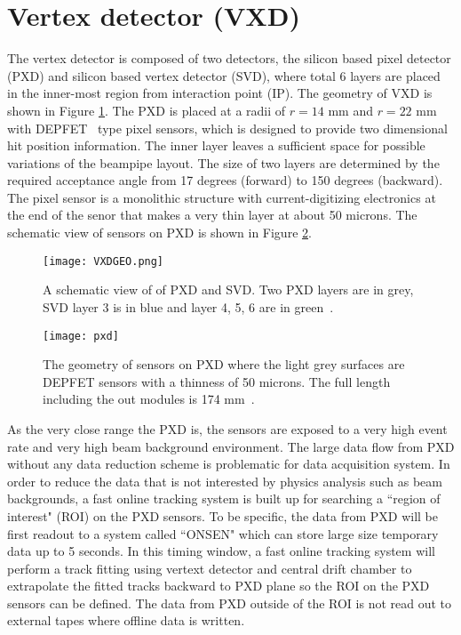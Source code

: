 \section{Vertex detector (VXD)}
The vertex detector is composed of two detectors, the silicon based pixel detector (PXD) and silicon based vertex detector (SVD), where total 6 layers are placed in the inner-most region from interaction point (IP).  The geometry of VXD is shown in Figure \ref{fig:svdgeo}. The PXD is placed at a radii of $r=14$ mm and $r=22$ mm with DEPFET~\cite{Abe:2010gxa} type pixel sensors, which is designed to provide two dimensional hit position information. The inner layer leaves a sufficient space for possible variations of the beampipe layout. The size of two layers are determined by the required acceptance angle from 17 degrees (forward) to 150 degrees (backward). The pixel sensor is a monolithic structure with current-digitizing electronics at the end of the senor that makes a very thin  layer at about 50 microns. The schematic view of sensors on PXD is shown in Figure \ref{fig:pxd}.
\begin{figure}[htpb]
	\centering
	\texttt{[image: VXDGEO.png]}
	\caption{A schematic view of of PXD and SVD. Two PXD layers are in grey, SVD layer 3 is in blue and layer 4, 5, 6 are in green~\cite{Abe:2010gxa}.}
	\label{fig:svdgeo}
\end{figure}
\begin{figure}[htpb]
\centering
\texttt{[image: pxd]}
\caption{The geometry of sensors on PXD where the light grey surfaces are DEPFET sensors with a thinness of 50 microns. The full length including the out modules is 174 mm~\cite{Abe:2010gxa}. }
\label{fig:pxd}
\end{figure}
 As the very close range the PXD is, the sensors are exposed to a very high event rate and very high beam background environment. The large data flow from PXD without any data reduction scheme is problematic for data acquisition system. In order to reduce the data that is not interested by physics analysis such as beam backgrounds, a fast online tracking system is built up for searching a ``region of interest" (ROI) on the PXD sensors. To be specific, the data from PXD will be first readout to a system called ``ONSEN" which can store large size temporary data up to 5 seconds. In this timing window, a fast online tracking system will perform a track fitting using vertext detector and central drift chamber to extrapolate the fitted tracks backward to PXD plane so the ROI on the PXD sensors can be defined. The data from PXD outside of the ROI is not read out to external tapes where offline data is written. 

